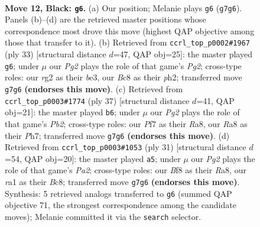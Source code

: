 \documentclass[11pt]{article}
\begin{document}
\clearpage

\begin{figure}[p]\centering
\begin{subfigure}{0.46\textwidth}\centering
\resizebox{\linewidth}{!}{%
\newchessgame
\chessboard[
  setfen={r1bk1b1r/p1p2ppp/2p5/8/8/8/PPP2PRP/RNB1K3 b Q - 0 12},
  showmover=false,
  pgfstyle=straightmove, color=movearrow, markmove={g7-g6}
]}
\caption{}
\end{subfigure}\hfill
\begin{subfigure}{0.46\textwidth}\centering
\resizebox{\linewidth}{!}{%
\newchessgame
\chessboard[
  setfen={r4b1r/p4ppp/4k3/3p4/8/4BP2/PP3P1P/R3K1R1 b Q - 3 17},
  showmover=false,
  pgfstyle=straightmove, color=movearrow, markmove={g7-g6}
]}
\caption{}
\end{subfigure}
\\[4pt]
\begin{subfigure}{0.46\textwidth}\centering
\resizebox{\linewidth}{!}{%
\newchessgame
\chessboard[
  setfen={r1br4/pp3k1p/5p2/3p3P/8/P2P4/5PP1/1RB1K2R b K - 2 19},
  showmover=false,
  pgfstyle=straightmove, color=movearrow, markmove={b7-b6}
]}
\caption{}
\end{subfigure}\hfill
\begin{subfigure}{0.46\textwidth}\centering
\resizebox{\linewidth}{!}{%
\newchessgame
\chessboard[
  setfen={r1b2rk1/p4ppp/8/3p4/8/P1P1B3/5PPP/R3K2R b KQ - 0 16},
  showmover=false,
  pgfstyle=straightmove, color=movearrow, markmove={a7-a5}
]}
\caption{}
\end{subfigure}
\caption{\textbf{Move 12, Black: \texttt{g6}.} (a) Our position; Melanie plays \texttt{g6} (\texttt{g7g6}). Panels (b)--(d) are the retrieved master positions whose correspondence most drove this move (highest QAP objective among those that transfer to it). (b) Retrieved from \texttt{ccrl\_top\_p0002\#1967} (ply 33) [structural distance $d$=47, QAP obj=25]: the master played \texttt{g6}; under $\mu$ our \emph{Pg2} plays the role of that game's \emph{Pg2}; cross-type roles: our \emph{r}g2 as their \emph{b}e3, our \emph{B}c8 as their \emph{p}h2; transferred move \texttt{g7g6} \textbf{(endorses this move)}. (c) Retrieved from \texttt{ccrl\_top\_p0003\#1774} (ply 37) [structural distance $d$=41, QAP obj=21]: the master played \texttt{b6}; under $\mu$ our \emph{Pg2} plays the role of that game's \emph{Pb2}; cross-type roles: our \emph{P}f7 as their \emph{R}a8, our \emph{R}a8 as their \emph{P}h7; transferred move \texttt{g7g6} \textbf{(endorses this move)}. (d) Retrieved from \texttt{ccrl\_top\_p0003\#1053} (ply 31) [structural distance $d$=54, QAP obj=20]: the master played \texttt{a5}; under $\mu$ our \emph{Pg2} plays the role of that game's \emph{Pa2}; cross-type roles: our \emph{B}f8 as their \emph{R}a8, our \emph{r}a1 as their \emph{B}c8; transferred move \texttt{g7g6} \textbf{(endorses this move)}. Synthesis: 5 retrieved analogs transferred to \texttt{g6} (summed QAP objective 71, the strongest correspondence among the candidate moves); Melanie committed it via the \texttt{search} selector.}
\label{fig:thought-m23}
\end{figure}
\end{document}
